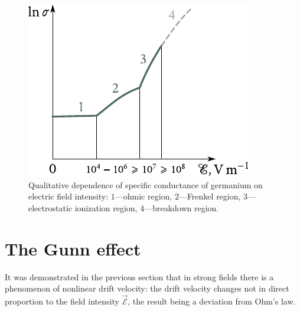 \begin{figure}[t]
	\begin{center}
		\includegraphics[scale=1]{figures/ch_06/fig_6_16.pdf}
		\caption[]{Qualitative dependence of specific conductance of germanium on electric field intensity: $1$---ohmic region, $2$---Frenkel region, $3$---electrostatic ionization region, $4$---breakdown region.}
		\label{fig:6_16}
	\end{center}
	\vspace{-0.7cm}
\end{figure}

\section{The Gunn effect}\label{sec:59}

It was demonstrated in the previous section that in strong fields there is a phenomenon of nonlinear drift velocity: the drift velocity changes not in direct proportion to the field intensity $\vec{\mathcal{E}}$, the result being a deviation from Ohm's law.

